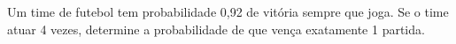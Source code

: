 %
%


\begin{exercicioBanco}[\valorquestao]
Um time de futebol tem probabilidade 0,92 de vitória sempre que joga. Se o time atuar 4 vezes, determine a probabilidade de que vença exatamente 1 partida.
\end{exercicioBanco}


